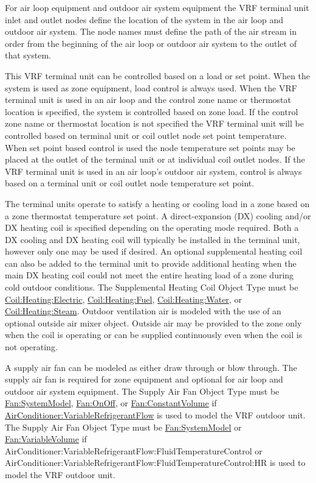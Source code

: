 For air loop equipment and outdoor air system equipment the VRF terminal unit inlet and outlet nodes define the location of the system in the air loop and outdoor air system. The node names must define the path of the air stream in order from the beginning of the air loop or outdoor air system to the outlet of that system.

This VRF terminal unit can be controlled based on a load or set point. When the system is used as zone equipment, load control is always used. When the VRF terminal unit is used in an air loop and the control zone name or thermostat location is specified, the system is controlled based on zone load. If the control zone name or thermostat location is not specified the VRF terminal unit will be controlled based on terminal unit or coil outlet node set point temperature. When set point based control is used the node temperature set points may be placed at the outlet of the terminal unit or at individual coil outlet nodes. If the VRF terminal unit is used in an air loop's outdoor air system, control is always based on a terminal unit or coil outlet node temperature set point.

The terminal units operate to satisfy a heating or cooling load in a zone based on a zone thermostat temperature set point. A direct-expansion (DX) cooling and/or DX heating coil is specified depending on the operating mode required. Both a DX cooling and DX heating coil will typically be installed in the terminal unit, however only one may be used if desired. An optional supplemental heating coil can also be added to the terminal unit to provide additional heating when the main DX heating coil could not meet the entire heating load of a zone during cold outdoor conditions. The Supplemental Heating Coil Object Type must be \hyperref[coilheatingelectric]{Coil:Heating:Electric}, \hyperref[coilheatinggas-000]{Coil:Heating:Fuel}, \hyperref[coilheatingwater]{Coil:Heating:Water}, or \hyperref[coilheatingsteam]{Coil:Heating:Steam}. Outdoor ventilation air is modeled with the use of an optional outside air mixer object. Outside air may be provided to the zone only when the coil is operating or can be supplied continuously even when the coil is not operating.

A supply air fan can be modeled as either draw through or blow through. The supply air fan is required for zone equipment and optional for air loop and outdoor air system equipment. The Supply Air Fan Object Type must be \hyperref[fansystemmodel]{Fan:SystemModel}, \hyperref[fanonoff]{Fan:OnOff}, or \hyperref[fanconstantvolume]{Fan:ConstantVolume} if \hyperref[airconditionervariablerefrigerantflow]{AirConditioner:VariableRefrigerantFlow} is used to model the VRF outdoor unit. The Supply Air Fan Object Type must be \hyperref[fansystemmodel]{Fan:SystemModel} or \hyperref[fanvariablevolume]{Fan:VariableVolume} if AirConditioner:VariableRefrigerantFlow:\-FluidTemperatureControl or AirConditioner:VariableRefrigerantFlow:\-FluidTemperatureControl:HR is used to model the VRF outdoor unit.

